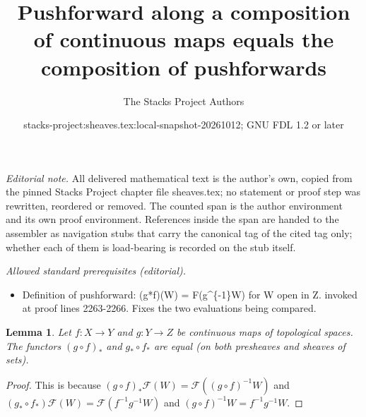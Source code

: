 \documentclass{stacks-project}
\title{Pushforward along a composition of continuous maps equals the composition of pushforwards}
\author{The Stacks Project Authors}
\date{stacks-project:sheaves.tex:local-snapshot-20261012; GNU FDL 1.2 or later}
\theoremstyle{plain}
\newtheorem{lemma}[subsection]{Lemma}
\theoremstyle{definition}
\theoremstyle{remark}
\numberwithin{equation}{subsection}
\begin{document}
\maketitle
\setcounter{subsection}{1}
\noindent\textit{Editorial note.} All delivered mathematical text is the author's own, copied from the pinned Stacks Project chapter file sheaves.tex; no statement or proof step was rewritten, reordered or removed. The counted span is the author environment and its own proof environment. References inside the span are handed to the assembler as navigation stubs that carry the canonical tag of the cited tag only; whether each of them is load-bearing is recorded on the stub itself.\par\medskip
\noindent\textit{Allowed standard prerequisites (editorial).}\begin{itemize}
\item Definition of pushforward: (g*f)(W) = F(g\textasciicircum{}\{-1\}W) for W open in Z. invoked at proof lines 2263-2266. Fixes the two evaluations being compared.
\end{itemize}\medskip
\begin{lemma}
\label{lemma-pushforward-composition}
Let $f : X \to Y$ and $g : Y \to Z$ be continuous maps
of topological spaces. The functors $(g \circ f)_*$
and $g_* \circ f_*$ are equal (on both presheaves
and sheaves of sets).
\end{lemma}

\begin{proof}
This is because $(g \circ f)_*\mathcal{F}(W) =
\mathcal{F}((g \circ f)^{-1}W)$ and
$(g_* \circ f_*)\mathcal{F}(W) = \mathcal{F}(f^{-1} g^{-1} W)$
and $(g \circ f)^{-1}W = f^{-1} g^{-1} W$.
\end{proof}
\end{document}
